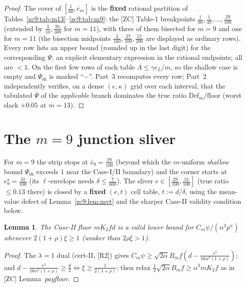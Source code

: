 \documentclass[11pt]{amsart}
\newtheorem{lemma}[theorem]{Lemma}
\newcommand{\Def}{\mathrm{Def}}
\begin{document}
\begin{proof}
The cover of $[\tfrac1{60},\bar e_m]$ is the \textbf{fixed} rational partition of
Tables~\ref{zc9:tab:m13}--\ref{zc9:tab:m9}: the [ZC] Table-1 breakpoints
$\tfrac1{60},\tfrac1{48},\dots,\tfrac{29}{100}$ (extended by
$\tfrac{3}{10},\tfrac{91}{300}$ for $m=11$), with three of them bisected for
$m=9$ and one for $m=11$ (the bisection midpoints $\tfrac3{160},\tfrac{27}{100},
\tfrac{57}{200}$ are displayed as ordinary rows).  Every row lists an upper
bound (rounded up in the last digit) for the corresponding $\Psi$, an explicit
elementary expression in the rational endpoints; all are $<1$.  On the first few
rows of each table $\Lambda\le\gamma e_L/m$, so the shallow case is empty and
$\Psi_{\mathrm{sh}}$ is marked ``$-$''.  Part~3 recomputes every row; Part~2
independently verifies, on a dense $(e,\kappa)$ grid over each interval, that
the tabulated $\Psi$ of the \emph{applicable} branch dominates the true ratio
$\Def_m/\text{floor}$ (worst slack $+0.05$ at $m=13$).
\end{proof}



\section{The $m=9$ junction sliver}\label{zc9:sec:sliver}

For $m=9$ the strip stops at $\bar e_9=\tfrac{29}{100}$ (beyond which the
$m$-uniform \emph{shallow} bound $\Psi_{\mathrm{sh}}$ exceeds $1$ near the
Case-I/II boundary) and the corner starts at $e^\star_9=\tfrac{31}{100}$ (its
$\ell$-envelope needs $\delta\le\tfrac7{600}$).  The sliver
$e\in[\tfrac{29}{100},\tfrac{31}{100}]$ (true ratio $\le0.13$ there) is closed by
a \textbf{fixed} $(e,t)$ cell table, $t:=d/\delta$, using the mean-value defect
of Lemma~\ref{zc9:lem:mvt} and the sharper Case-II validity condition below.

\begin{lemma}\label{zc9:lem:certIIval}
The Case-II floor $mK_2fd$ is a valid lower bound for $C_m\psi/(\alpha^3p^{n})$
whenever $2(1+\rho)\xi\ge1$ (weaker than $2\rho\xi>1$).
\end{lemma}
\begin{proof}
The $\lambda=1$ dual (cert-II, [R2]) gives $C_m\psi\ge\sqrt{2\alpha}B_mf
(d-\tfrac{e^2}{16\alpha^2(1+\rho)})$; and
$d-\tfrac{e^2}{16\alpha^2(1+\rho)}\ge\tfrac d2\iff\xi\ge\tfrac1{2(1+\rho)}$; then
relax $\tfrac12\sqrt{2\alpha}B_mf\ge\alpha^3 mK_2f$ as in [ZC]
Lemma~\emph{payfloor}.
\end{proof}
\end{document}

